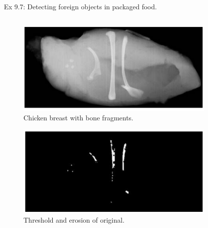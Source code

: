 \begin{frame}
Ex 9.7: Detecting foreign objects in packaged food.
\begin{columns}
\begin{column}{.6\textwidth}
\begin{figure}[!h]
\includegraphics[width=.6\textwidth]{fig-9-18a.png}
\caption{Chicken breast with bone fragments.}
\end{figure}
\begin{figure}[!h]
\includegraphics[width=.6\textwidth]{fig-9-18c.png}
\caption{Threshold and erosion of original.}
\end{figure}
\end{column}
\begin{column}{.3\textwidth}
\begin{figure}[!h]

\end{figure}
\end{column}
\end{columns}
\end{frame}
